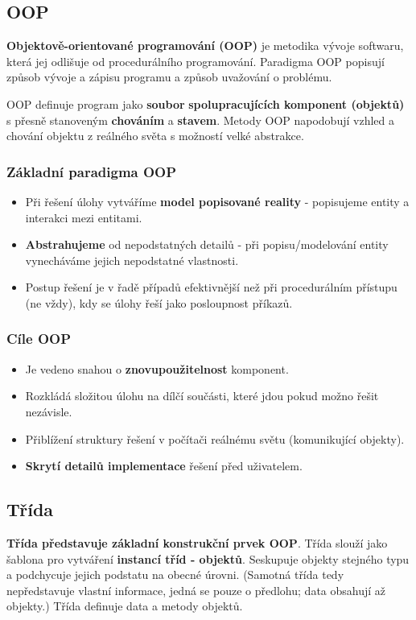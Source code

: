 \subsection{OOP}
\textbf{Objektově-orientované programování (OOP)} je metodika vývoje softwaru, která jej odlišuje od procedurálního programování. Paradigma OOP popisují způsob vývoje a zápisu programu a způsob uvažování o problému. 

OOP definuje program jako \textbf{soubor} \textbf{spolupracujících komponent (objektů)} s přesně stanoveným \textbf{chováním} a \textbf{stavem}. Metody OOP napodobují vzhled a chování objektu z reálného světa s možností velké abstrakce.

\subsubsection{Základní paradigma OOP}
\begin{itemize}
\item Při řešení úlohy vytváříme \textbf{model popisované reality} - popisujeme entity a interakci mezi entitami.
\item \textbf{Abstrahujeme} od nepodstatných detailů - při popisu/modelování entity vynecháváme jejich nepodstatné vlastnosti.
\item Postup řešení je v řadě případů efektivnější než při procedurálním přístupu (ne vždy), kdy se úlohy řeší jako posloupnost příkazů.
\end{itemize}

\subsubsection{Cíle OOP}
\begin{itemize}
\item Je vedeno snahou o \textbf{znovupoužitelnost} komponent.
\item Rozkládá složitou úlohu na dílčí součásti, které jdou pokud možno řešit nezávisle.
\item Přiblížení struktury řešení v počítači reálnému světu (komunikující objekty).
\item \textbf{Skrytí detailů implementace} řešení před uživatelem.
\end{itemize}

\subsection{Třída}
\textbf{Třída představuje základní konstrukční prvek OOP}. Třída slouží jako šablona pro vytváření \textbf{instancí tříd - objektů}. Seskupuje objekty stejného typu a podchycuje jejich podstatu na obecné úrovni.  (Samotná třída tedy nepředstavuje vlastní informace, jedná se pouze o předlohu; data obsahují až objekty.) Třída definuje data a metody objektů. \textbf{}

